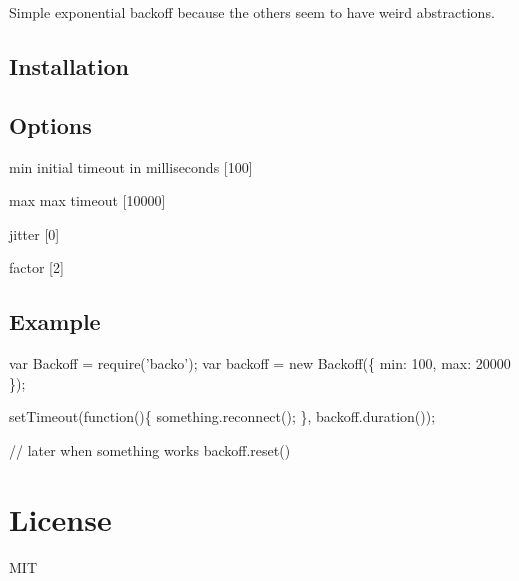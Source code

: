Simple exponential backoff because the others seem to have weird abstractions.

\subsection*{Installation}




\subsection*{Options}


\begin{DoxyItemize}
\item {\ttfamily min} initial timeout in milliseconds \mbox{[}100\mbox{]}
\item {\ttfamily max} max timeout \mbox{[}10000\mbox{]}
\item {\ttfamily jitter} \mbox{[}0\mbox{]}
\item {\ttfamily factor} \mbox{[}2\mbox{]}
\end{DoxyItemize}

\subsection*{Example}


\begin{DoxyCode}
var Backoff = require('backo');
var backoff = new Backoff(\{ min: 100, max: 20000 \});

setTimeout(function()\{
  something.reconnect();
\}, backoff.duration());

// later when something works
backoff.reset()
\end{DoxyCode}


\section*{License}

M\+IT 